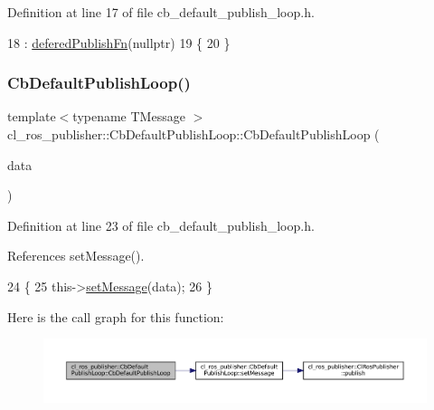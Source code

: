 Definition at line 17 of file cb\+\_\+default\+\_\+publish\+\_\+loop.\+h.


\begin{DoxyCode}
18         : \hyperlink{classcl__ros__publisher_1_1CbDefaultPublishLoop_ac0044704637edbd8f79a69d5b06de9ba}{deferedPublishFn}(\textcolor{keyword}{nullptr})
19     \{
20     \}
\end{DoxyCode}
\mbox{\label{classcl__ros__publisher_1_1CbDefaultPublishLoop_a41c35ec9ece9d457aa31efccfe4666c6}} 
\subsubsection{\texorpdfstring{Cb\+Default\+Publish\+Loop()}{CbDefaultPublishLoop()}\hspace{0.1cm}{\footnotesize\ttfamily [2/2]}}
{\footnotesize\ttfamily template$<$typename T\+Message $>$ \\
cl\+\_\+ros\+\_\+publisher\+::\+Cb\+Default\+Publish\+Loop\+::\+Cb\+Default\+Publish\+Loop (\begin{DoxyParamCaption}\item[{const T\+Message \&}]{data }\end{DoxyParamCaption})\hspace{0.3cm}{\ttfamily [inline]}}



Definition at line 23 of file cb\+\_\+default\+\_\+publish\+\_\+loop.\+h.



References set\+Message().


\begin{DoxyCode}
24     \{
25         this->\hyperlink{classcl__ros__publisher_1_1CbDefaultPublishLoop_a0377d84fde4cd1193abe5daf172359a7}{setMessage}(data);
26     \}
\end{DoxyCode}
Here is the call graph for this function\+:
\nopagebreak
\begin{figure}[H]
\begin{center}
\leavevmode
\includegraphics[width=350pt]{classcl__ros__publisher_1_1CbDefaultPublishLoop_a41c35ec9ece9d457aa31efccfe4666c6_cgraph}
\end{center}
\end{figure}


